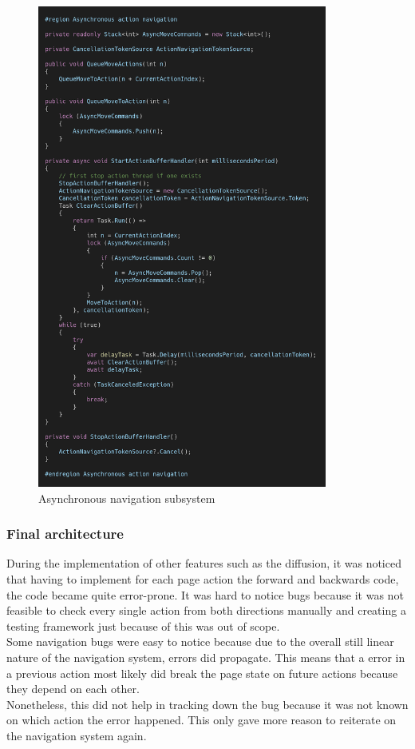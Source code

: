 \begin{figure}
\centering
\includegraphics[width=0.85\textwidth]{figures/code/nav-arch/async-navigation.png}
\caption{Asynchronous navigation subsystem}
\label{fig:async.navigation}
\end{figure}

\subsubsection{Final architecture}

During the implementation of other features such as the diffusion, it was noticed that having to implement for each page action the forward and backwards code, the code became quite error-prone. It was hard to notice bugs because it was not feasible to check every single action from both directions manually and creating a testing framework just because of this was out of scope. \\
Some navigation bugs were easy to notice because due to the overall still linear nature of the navigation system, errors did propagate. This means that a error in a previous action most likely did break the page state on future actions because they depend on each other. \\
Nonetheless, this did not help in tracking down the bug because it was not known on which action the error happened. This only gave more reason to reiterate on the navigation system again.

